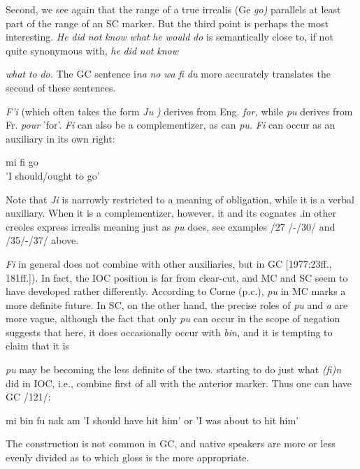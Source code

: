 Second, we see again that the range of a true irrealis (Ge \textit{go}\textit{)} parallels at least part of the range of an SC marker. But the third point is perhaps the most interesting. \textit{He }\textit{did} \textit{not} \textit{know} \textit{what} \textit{he} \textit{would} \textit{do }is semantically close to, if not quite synonymous with, \textit{he} \textit{did} \textit{not} \textit{know}

\textit{what} \textit{to} \textit{do.} The GC sentence i\textit{na} \textit{no} \textit{wa} \textit{fi} \textit{du} more accurately translates the second of these sentences.

\textit{F'i} (which often takes the form \textit{Ju} \textit{)} derives from Eng. \textit{for,} while \textit{pu} derives from Fr. \textit{pour} 'for'. \textit{Fi} can also be a complementizer, as can \textit{pu.} \textit{Fi} can occur as an auxiliary in its own right:


\ea\label{ex:120}
mi fi go\\
\glt 'I should/ought to go'
\z


Note that \textit{Ji} is narrowly restricted to a meaning of obligation, while it is a verbal auxiliary. When it is a complementizer, however, it and its cognates .in other creoles express irrealis meaning just as \textit{pu} does, see examples /27 /-/30/ and /35/-/37/ above.

\textit{Fi} in general does not combine with other auxiliaries, but in GC
[1977:23ff., 181ff.]). In fact, the IOC position is far from clear-cut, and MC and SC seem to have developed rather differently. According to Corne (p.c.), \textit{pu} in MC marks a more definite future. In SC, on the other hand, the precise roles of \textit{pu} and \textit{a }are more vague, although the fact that only \textit{pu} can occur in the scope of negation suggests that here,
it does occasionally occur with \textit{bin,} and it is tempting to claim that it is

\textit{pu} may be becoming the less definite of the two.
starting to do just what \textit{(fi)n} did in IOC, i.e., combine first of all with the anterior marker. Thus one can have GC /121/:

\ea\label{ex:121}
 mi bin fu nak am
\glt 'I should have hit him' or 'I was about to hit him'
\z



The construction is not common in GC, and native speakers are more or less evenly divided as to which gloss is the more appropriate.

